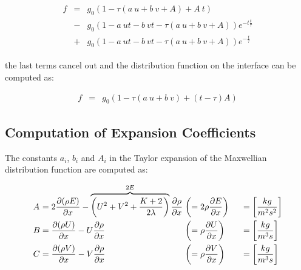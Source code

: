 \documentclass[
	pdftex,             %
	12pt,				%
	a4paper,		   	%
	english,				%
	oneside,			%
]{article}
\begin{document}
\begin{equation}
\begin{split}
\begin{array}{lcll}
f
&=&
g_0 \left( 1 - \tau (a~u + b~v + A) + A~t \right)
\\
&-&
g_0 \left( 1 - a~ut - b~vt - \tau(a~u + b~v + A) \right) e^{-t\tfrac{t}{\tau}}
\\
&+& 
g_0 \left( 1 - a~ut - b~vt - \tau \left( a~u + b~v + A \right) \right) e^{-\tfrac{t}{\tau}}
\end{array}
\end{split}
\end{equation}

the last terms cancel out and the distribution function on the interface can be computed as:

\begin{equation}
\begin{array}{lcl}
f &=& g_0 \left( 1 - \tau (a~u + b~v) + (t-\tau)A \right)
\end{array}
\end{equation}

\clearpage

\subsection*{Computation of Expansion Coefficients}

The constants $a_i$, $b_i$ and $A_i$ in the Taylor expansion of the Maxwellian distribution function are computed as:

\begin{eqnarray}
\begin{split}
\arraycolsep=1.4pt\def\arraystretch{2.2}
\begin{array}{lclll}
A &=& 2 \dfrac{\partial (\rho E)}{\partial x} 
  - \overbrace{ \left( U^2 + V^2 + \dfrac{K+2}{2\lambda} \right) }^{2E} \dfrac{\partial\rho}{\partial x}
    &\left( = 2 \rho \dfrac{\partial E}{\partial x} \right)
    & \hspace{0.5cm} = \left[\dfrac{kg}{m^2s^2} \right]
\\
B &=& \dfrac{\partial (\rho U)}{\partial x} - U\dfrac{\partial \rho}{\partial x}
	&\left( = \rho \dfrac{\partial U}{\partial x} \right)
    & \hspace{0.5cm} = \left[\dfrac{kg}{m^3s} \right]
\\
C &=& \dfrac{\partial (\rho V)}{\partial x} - V\dfrac{\partial \rho}{\partial x}
	&\left( = \rho \dfrac{\partial V}{\partial x} \right)
    & \hspace{0.5cm} = \left[\dfrac{kg}{m^3s} \right]
\end{array}
\end{split}
\end{eqnarray}
\end{document}
